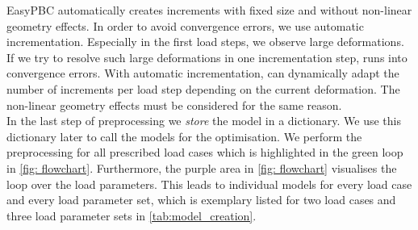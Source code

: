 EasyPBC automatically creates increments with fixed size and without non-linear geometry effects. 
In order to avoid convergence errors, we use automatic incrementation.
Especially in the first load steps, we observe large deformations.
If we try to resolve such large deformations in one incrementation step,  runs into convergence errors.
With automatic incrementation,  can dynamically adapt the number of increments per load step depending on the current deformation. The non-linear geometry effects must be considered for the same reason. \\
\indent In the last step of preprocessing we \emph{store} the model in a dictionary. We use this dictionary later to call the models for the optimisation.
We perform the preprocessing for all prescribed load cases which is highlighted in the green loop in \autoref{fig: flowchart}. Furthermore, the purple area in \autoref{fig: flowchart} visualises the loop over the load parameters. This leads to individual models for every load case and every load parameter set, which is exemplary listed for two load cases and three load parameter sets in \autoref{tab:model_creation}.

